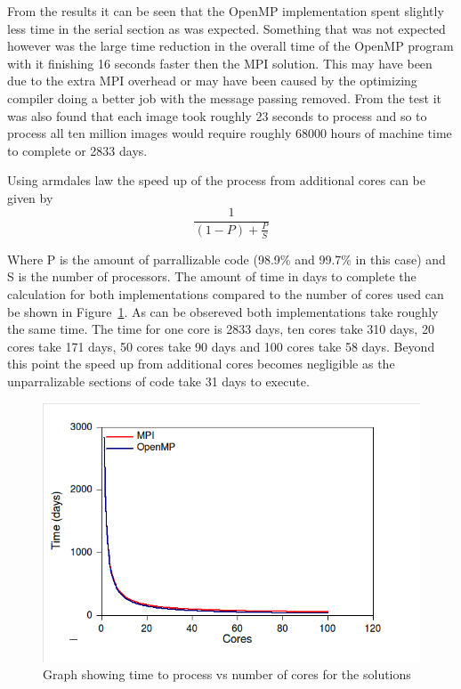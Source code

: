 From the results it can be seen that the OpenMP implementation spent slightly less time in the serial section as was expected. Something that was not expected however was the large time reduction in the overall time of the OpenMP program with it finishing 16 seconds faster then the MPI solution. This may have been due to the extra MPI overhead or may have been caused by the optimizing compiler doing a better job with the message passing removed. From the test it was also found that each image took roughly 23 seconds to process and so to process all ten million images would require roughly 68000 hours of machine time to complete or 2833 days.

Using armdales law the speed up of the process from additional cores can be given by
\[
 \frac{1}{(1-P) + \frac{P}{S}}
\]

Where P is the amount of parrallizable code (98.9\% and 99.7\% in this case) and S is the number of processors. The amount of time in days to complete the calculation for both implementations compared to the number of cores used can be shown in Figure~\ref{mpi-time-cores}. As can be obsereved both implementations take roughly the same time. The time for one core is 2833 days, ten cores take 310 days, 20 cores take 171 days, 50 cores take 90 days and 100 cores take 58 days. Beyond this point the speed up from additional cores becomes negligible as the unparralizable sections of code take 31 days to execute. 

\begin{figure}[ht]
	\begin{center}
		\includegraphics[width=1.0\textwidth]{mpi-time-cores}
	\end{center}
	\caption{Graph showing time to process vs number of cores for the solutions}
	\label{mpi-time-cores}
\end{figure}

